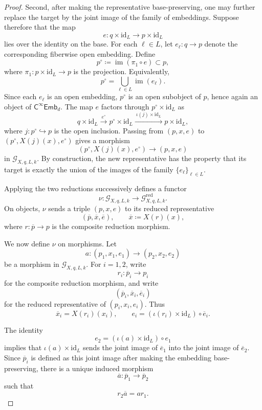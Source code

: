 \documentclass{amsart}
\newcommand{\cat}[1]{\mathsf{#1}}
\newcommand{\id}{\mathrm{id}}
\newcommand{\fembnoniso}[1]{\cat{C}^{\infty}\cat{Emb}_{#1}}
\theoremstyle{definition}
\numberwithin{equation}{subsection}
\numberwithin{subsubsection}{subsection}
\begin{document}
\begin{proof}
  Second, after making the representative base-preserving, one may further
  replace the target by the joint image of the family of embeddings. Suppose
  therefore that the map
  \[
    e:q\times \id_L\longrightarrow p\times \id_L
  \]
  lies over the identity on the base. For each \(\ell\in L\), let
  \(e_\ell:q\to p\) denote the corresponding fiberwise open embedding. Define
  \[
    p^\circ\coloneqq \operatorname{im}(\pi_1\circ e)\subset p,
  \]
  where \(\pi_1:p\times \id_L\to p\) is the projection. Equivalently,
  \[
    p^\circ=\bigcup_{\ell\in L}\operatorname{im}(e_\ell).
  \]
  Since each \(e_\ell\) is an open embedding, \(p^\circ\) is an open subobject
  of \(p\), hence again an object of \(\fembnoniso{d}\). The map \(e\) factors
  through \(p^\circ\times \id_L\) as
  \[
    q\times \id_L
    \xrightarrow{\ e^\circ\ }
    p^\circ\times \id_L
    \xrightarrow{\ \iota(j)\times \id_L\ }
    p\times \id_L,
  \]
  where \(j:p^\circ\hookrightarrow p\) is the open inclusion. Passing from
  \((p,x,e)\) to \((p^\circ,X(j)(x),e^\circ)\) gives a morphism
  \[
    (p^\circ,X(j)(x),e^\circ)\longrightarrow (p,x,e)
  \]
  in \(\mathcal{G}_{X,q,L,k}\). By construction, the new representative has
  the property that its target is exactly the union of the images of the
  family \(\{e_\ell\}_{\ell\in L}\).

  Applying the two reductions successively defines a functor
  \[
    \nu:\mathcal{G}_{X,q,L,k}\longrightarrow
    \mathcal{G}^{\mathrm{red}}_{X,q,L,k}.
  \]
  On objects, \(\nu\) sends a triple \((p,x,e)\) to its reduced representative
  \[
    (\overline{p},\overline{x},\overline{e}),
    \qquad
    \overline{x}\coloneqq X(r)(x),
  \]
  where \(r:\overline{p}\to p\) is the composite reduction morphism.

  We now define \(\nu\) on morphisms. Let
  \[
    a:(p_1,x_1,e_1)\longrightarrow(p_2,x_2,e_2)
  \]
  be a morphism in \(\mathcal{G}_{X,q,L,k}\). For \(i=1,2\), write
  \[
    r_i:\overline{p}_i\longrightarrow p_i
  \]
  for the composite reduction morphism, and write
  \[
    (\overline{p}_i,\overline{x}_i,\overline{e}_i)
  \]
  for the reduced representative of \((p_i,x_i,e_i)\). Thus
  \[
    \overline{x}_i=X(r_i)(x_i),
    \qquad
    e_i=(\iota(r_i)\times\id_L)\circ \overline{e}_i.
  \]

  The identity
  \[
    e_2=(\iota(a)\times\id_L)\circ e_1
  \]
  implies that \(\iota(a)\times\id_L\) sends the joint image of
  \(\overline{e}_1\) into the joint image of \(\overline{e}_2\). Since
  \(\overline{p}_i\) is defined as this joint image after making the embedding
  base-preserving, there is a unique induced morphism
  \[
    \overline{a}:\overline{p}_1\longrightarrow\overline{p}_2
  \]
  such that
  \[
    r_2\overline{a}=a r_1.
  \]


\end{proof}
\end{document}
